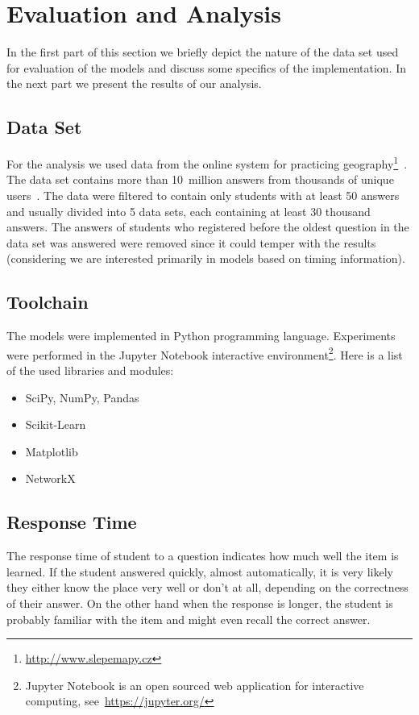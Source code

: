 \chapter{Evaluation and Analysis}

In the first part of this section we briefly depict the nature of the data set used for evaluation of the models and discuss some specifics of the implementation. In the next part we present the results of our analysis.

\section{Data Set}

For the analysis we used data from the online system for practicing geography\footnote{\url{http://www.slepemapy.cz}}~\cite{Papousek2014}. The data set contains more than 10~million answers from thousands of unique users~\cite{Papousek2015}. The data were filtered to contain only students with at least 50 answers and usually divided into 5 data sets, each containing at least 30 thousand answers. The answers of students who registered before the oldest question in the data set was answered were removed since it could temper with the results (considering we are interested primarily in models based on timing information).

\section{Toolchain}

The models were implemented in Python programming language. Experiments were performed in the Jupyter Notebook interactive environment\footnote{Jupyter Notebook is an open sourced web application for interactive computing, see~\url{https://jupyter.org/}}. Here is a list of the used libraries and modules:

\begin{itemize}
  \item SciPy, NumPy, Pandas
  \item Scikit-Learn
  \item Matplotlib
  \item NetworkX
\end{itemize}

\section{Response Time}

The response time of student to a question indicates how much well the item is learned. If the student answered quickly, almost automatically, it is very likely they either know the place very well or don't at all, depending on the correctness of their answer. On the other hand when the response is longer, the student is probably familiar with the item and might even recall the correct answer.

